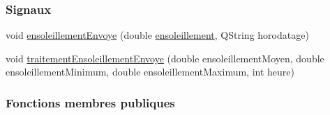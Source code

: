 \subsubsection*{Signaux}
\begin{DoxyCompactItemize}
\item 
void \hyperlink{class_infos_ensoleillement_ac89935ebb118ba2d28504d7341f67a7f}{ensoleillement\+Envoye} (double \hyperlink{class_infos_ensoleillement_a5f3ad64743e3beeb4e64c4555ec6155c}{ensoleillement}, Q\+String horodatage)
\item 
void \hyperlink{class_infos_ensoleillement_a8c0f6c50648ffc4f47f049727e05e8d0}{traitement\+Ensoleillement\+Envoye} (double ensoleillement\+Moyen, double ensoleillement\+Minimum, double ensoleillement\+Maximum, int heure)
\end{DoxyCompactItemize}
\subsubsection*{Fonctions membres publiques}
